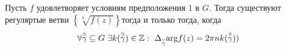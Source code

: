 Пусть $f$ удовлетворяет условиям предположения $1$ в $G$. Тогда существуют
регуляртые ветви $\left\{ \sqrt[n]{f(z)} \right\}$тогда и только тогда, когда
\begin{equation}\label{(16.15)}
    \forall \overset{\circ}{\gamma} \subseteq G \ \exists k(\overset{\circ}{\gamma}) \in \mathbb{Z}: \ \Delta_{\overset{\circ}{\gamma}}\mathrm{arg} f(z) = 2\pi n k(\overset{\circ}{\gamma}))
\end{equation}